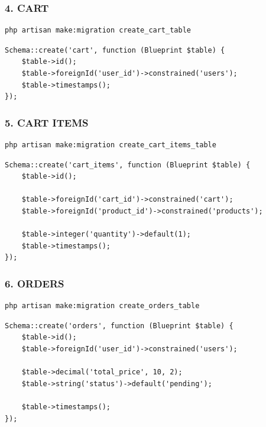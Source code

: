 \documentclass[12pt,a4paper]{article}
\begin{document}
\subsubsection{4. CART}
\begin{verbatim}
php artisan make:migration create_cart_table
\end{verbatim}

\begin{verbatim}
Schema::create('cart', function (Blueprint $table) {
    $table->id();
    $table->foreignId('user_id')->constrained('users');
    $table->timestamps();
});
\end{verbatim}

\subsubsection{5. CART ITEMS}
\begin{verbatim}
php artisan make:migration create_cart_items_table
\end{verbatim}

\begin{verbatim}
Schema::create('cart_items', function (Blueprint $table) {
    $table->id();

    $table->foreignId('cart_id')->constrained('cart');
    $table->foreignId('product_id')->constrained('products');

    $table->integer('quantity')->default(1);
    $table->timestamps();
});
\end{verbatim}

\subsubsection{6. ORDERS}
\begin{verbatim}
php artisan make:migration create_orders_table
\end{verbatim}

\begin{verbatim}
Schema::create('orders', function (Blueprint $table) {
    $table->id();
    $table->foreignId('user_id')->constrained('users');

    $table->decimal('total_price', 10, 2);
    $table->string('status')->default('pending');

    $table->timestamps();
});
\end{verbatim}
\end{document}
